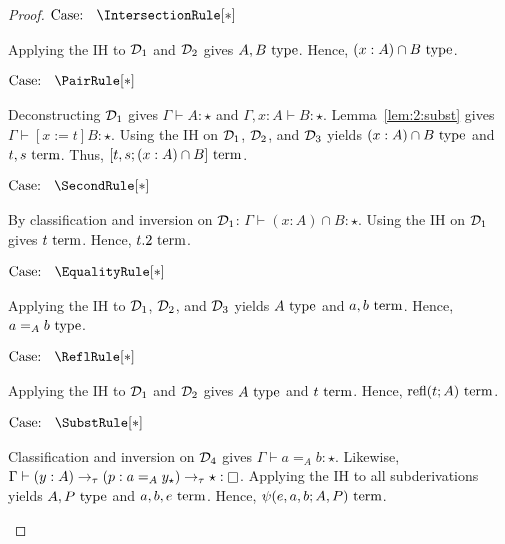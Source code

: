 \begin{proof}
    $\text{Case: }\begin{array}{c} \IntersectionRule[*] \end{array}$
    \begin{proofcase}
        Applying the IH to $\mathcal{D}_{1}$ and $\mathcal{D}_{2}$ gives $A, B~\textnormal{type}$.
        Hence, $(x : A) \cap B~\textnormal{type}$.
    \end{proofcase}

    $\text{Case: }\begin{array}{c} \PairRule[*] \end{array}$
    \begin{proofcase}
        Deconstructing $\mathcal{D}_{1}$ gives $\Gamma \vdash A : \star$ and $\Gamma, x : A \vdash B : \star$.
        Lemma~\ref{lem:2:subst} gives $\Gamma \vdash [x := t]B : \star$.
        Using the IH on $\mathcal{D}_{1}$, $\mathcal{D}_{2}$, and $\mathcal{D}_{3}$ yields $(x : A) \cap B~\textnormal{type}$ and $t, s~\textnormal{term}$.
        Thus, $[t, s; (x : A) \cap B]~\textnormal{term}$.
    \end{proofcase}

    $\text{Case: }\begin{array}{c} \SecondRule[*] \end{array}$
    \begin{proofcase}
        By classification and inversion on $\mathcal{D}_{1}$: $\Gamma \vdash (x : A) \cap B : \star$.
        Using the IH on $\mathcal{D}_{1}$ gives $t~\textnormal{term}$.
        Hence, $t.2~\textnormal{term}$.
    \end{proofcase}

    $\text{Case: }\begin{array}{c} \EqualityRule[*] \end{array}$
    \begin{proofcase}
        Applying the IH to $\mathcal{D}_{1}$, $\mathcal{D}_{2}$, and $\mathcal{D}_{3}$ yields $A~\textnormal{type}$ and $a, b~\textnormal{term}$.
        Hence, $a =_A b~\textnormal{type}$.
    \end{proofcase}

    $\text{Case: }\begin{array}{c} \ReflRule[*] \end{array}$
    \begin{proofcase}
        Applying the IH to $\mathcal{D}_{1}$ and $\mathcal{D}_{2}$ gives $A~\textnormal{type}$ and $t~\textnormal{term}$.
        Hence, $\textnormal{refl}(t; A)~\textnormal{term}$.
    \end{proofcase}

    $\text{Case: }\begin{array}{c} \SubstRule[*] \end{array}$
    \begin{proofcase}
        Classification and inversion on $\mathcal{D}_{4}$ gives $\Gamma \vdash a =_A b : \star$.
        Likewise, $\Gamma \vdash (y : A) \to_\tau (p : a =_A y_\star) \to_\tau \star : \kind$.
        Applying the IH to all subderivations yields $A, P~\textnormal{type}$ and $a, b, e~\textnormal{term}$.
        Hence, $\psi(e, a, b; A, P)~\textnormal{term}$.
    \end{proofcase}


\end{proof}
